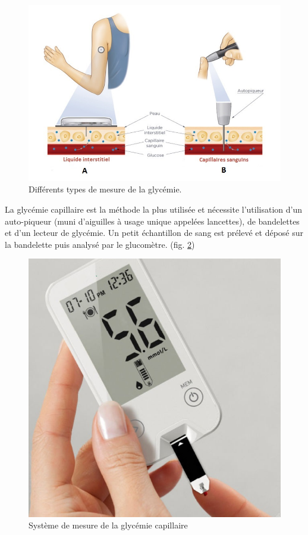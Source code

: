      \begin{figure}[H]
        \centering
        \includegraphics[scale=0.55]{images/glucometreVSfreestyle2.jpg}
        \caption{\label{fig:capillaireVSinterstitiel}Différents types de mesure de la glycémie.}
    \end{figure}
    
    
    La glycémie capillaire est la méthode la plus utilisée et nécessite l'utilisation d'un auto-piqueur (muni d'aiguilles à usage unique appelées lancettes), de bandelettes et d'un lecteur de glycémie. Un petit échantillon de sang est prélevé et déposé sur la bandelette puis analysé par le glucomètre.  (fig. \ref{fig:glycemieCapillaire})
    
    \begin{figure}[H]
        \centering
        \includegraphics[scale=0.33]{images/glucometre.jpg}
        \caption{\label{fig:glycemieCapillaire}Système de mesure de la glycémie capillaire}
    \end{figure}

